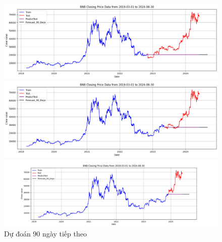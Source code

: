 \documentclass[conference]{IEEEtran}
\begin{document}
	\begin{figure}[H]
		\centering
		\begin{minipage}{0.15\textwidth}
			\centering
			\includegraphics[width=1\textwidth]{Figure/ARIMA_BTC_90days_73.png}
		\end{minipage}
		\hfill
		\begin{minipage}{0.15\textwidth}
			\centering
			\includegraphics[width=1\textwidth]{Figure/ARIMA_BTC_90days_82.png}
		\end{minipage}
		\hfill
		\begin{minipage}{0.15\textwidth}
			\centering
			\includegraphics[width=1\textwidth]{Figure/ARIMA_BTC_90days_91.png}
		\end{minipage}
		\caption{Dự đoán 90 ngày tiếp theo}
		\label{fig:1}
	\end{figure}
	
\end{document}
